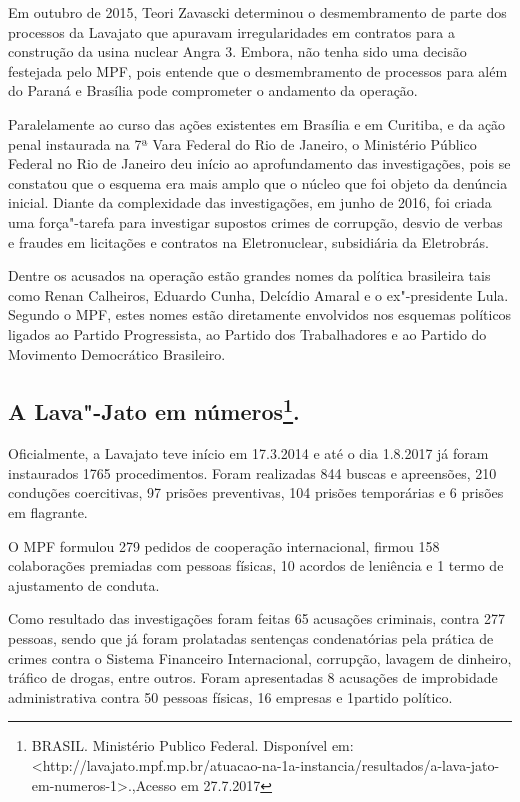 {Em outubro de 2015, Teori Zavascki determinou o desmembramento de parte
dos processos da Lavajato que apuravam irregularidades em contratos para
a construção da usina nuclear Angra 3. Embora, não tenha sido uma
decisão festejada pelo MPF, pois entende que o desmembramento de
processos para além do Paraná e Brasília pode comprometer o andamento da
operação.

Paralelamente ao curso das ações existentes em Brasília e em Curitiba, e
da ação penal instaurada na 7ª Vara Federal do Rio de Janeiro, o
Ministério Público Federal no Rio de Janeiro deu início ao
aprofundamento das investigações, pois se constatou que o esquema era
mais amplo que o núcleo que foi objeto da denúncia inicial. Diante da
complexidade das investigações, em junho de 2016, foi criada uma
força"-tarefa para investigar supostos crimes de corrupção, desvio de
verbas e fraudes em licitações e contratos na Eletronuclear, subsidiária
da Eletrobrás.

Dentre os acusados na operação estão grandes nomes da política
brasileira tais como Renan Calheiros, Eduardo Cunha, Delcídio Amaral e o
ex"-presidente Lula. Segundo o MPF, estes nomes estão diretamente
envolvidos nos esquemas políticos ligados ao Partido Progressista, ao
Partido dos Trabalhadores e ao Partido do Movimento Democrático
Brasileiro.

\subsection{A Lava"-Jato em números\footnote{BRASIL. Ministério Publico
  Federal. Disponível em:
 \textless{}http://lavajato.mpf.mp.br/atuacao-na-1a-instancia/resultados/a-lava-jato-em-numeros-1\textgreater{}.,Acesso
  em 27.7.2017}.}

Oficialmente, a Lavajato teve início em 17.3.2014 e até o dia 1.8.2017
já foram instaurados 1765 procedimentos. Foram realizadas 844 buscas e
apreensões, 210 conduções coercitivas, 97 prisões preventivas, 104
prisões temporárias e 6 prisões em flagrante.

O MPF formulou 279 pedidos de cooperação internacional, firmou 158
colaborações premiadas com pessoas físicas, 10 acordos de leniência e 1
termo de ajustamento de conduta.

Como resultado das investigações foram feitas 65 acusações criminais,
contra 277 pessoas, sendo que já foram prolatadas sentenças
condenatórias pela prática de crimes contra o Sistema Financeiro
Internacional, corrupção, lavagem de dinheiro, tráfico de drogas, entre
outros. Foram apresentadas 8 acusações de improbidade administrativa
contra 50 pessoas físicas, 16 empresas e 1partido político.

}
